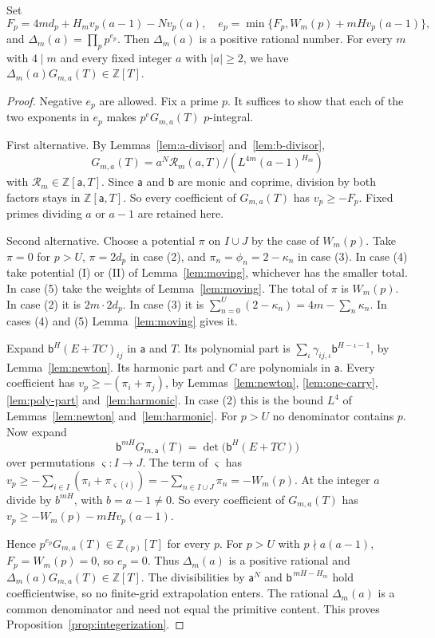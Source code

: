 \begin{proposition}\label{prop:integerization}
Set
\[
 F_p=4m d_p+H_m v_p(a-1)-Nv_p(a),
 \quad e_p=\min\{F_p,W_m(p)+mH v_p(a-1)\},
\]
and \(\Delta_m(a)=\prod_p p^{e_p}\). Then \(\Delta_m(a)\) is a positive rational number. For every \(m\) with \(4\mid m\) and every fixed integer \(a\) with \(|a|\ge2\), we have \(\Delta_m(a)G_{m,a}(T) \in \mathbb{Z}[T]\).
\end{proposition}

\begin{proof}
Negative \(e_p\) are allowed. Fix a prime \(p\). It suffices to show that each of the two exponents in \(e_p\) makes \(p^{e}G_{m,a}(T)\) \(p\)-integral.

First alternative. By Lemmas~\ref{lem:a-divisor} and~\ref{lem:b-divisor}, 
\[
 G_{m,a}(T)=a^N\mathcal R_m(a,T)/(L^{4m}(a-1)^{H_m})
\]
with \(\mathcal R_m\in\mathbb Z[\mathsf a,T]\). Since \(\mathsf a\) and \(\mathsf b\) are monic and coprime, division by both factors stays in \({\mathbb Z}[\mathsf a,T]\). So every coefficient of \(G_{m,a}(T)\) has \(v_p\ge-F_p\). Fixed primes dividing \(a\) or \(a-1\) are retained here.

Second alternative. Choose a potential \(\pi\) on \(I\cup J\) by the case of \(W_m(p)\). Take \(\pi=0\) for \(p>U\), \(\pi=2d_p\) in case (2), and \(\pi_n=\phi_n=2-\kappa_n\) in case (3). In case (4) take potential (I) or (II) of Lemma~\ref{lem:moving}, whichever has the smaller total. In case (5) take the weights of Lemma~\ref{lem:moving}. The total of \(\pi\) is \(W_m(p)\). In case (2) it is \(2m\cdot2d_p\). In case (3) it is \(\sum_{n=0}^{U}(2-\kappa_n)=4m-\sum_n\kappa_n\). In cases (4) and (5) Lemma~\ref{lem:moving} gives it.

Expand \(\mathsf b^H(E+TC)_{ij}\) in \(\mathsf a\) and \(T\). Its polynomial part is \(\sum_\iota\gamma_{ij,\iota}\mathsf b^{H-\iota-1}\), by Lemma~\ref{lem:newton}. Its harmonic part and \(C\) are polynomials in \(\mathsf a\). Every coefficient has \(v_p\ge-(\pi_i+\pi_j)\), by Lemmas~\ref{lem:newton}, \ref{lem:one-carry}, \ref{lem:poly-part} and~\ref{lem:harmonic}. In case (2) this is the bound \(L^4\) of Lemmas~\ref{lem:newton} and~\ref{lem:harmonic}. For \(p>U\) no denominator contains \(p\). Now expand
\[
 \mathsf b^{mH}G_{m,\mathsf a}(T)=\det\bigl(\mathsf b^H(E+TC)\bigr)
\]
over permutations \(\varsigma\colon I\to J\). The term of \(\varsigma\) has \(v_p\ge-\sum_{i\in I}(\pi_i+\pi_{\varsigma(i)})=-\sum_{n\in I\cup J}\pi_n=-W_m(p)\). At the integer \(a\) divide by \(b^{mH}\), with \(b=a-1\ne0\). So every coefficient of \(G_{m,a}(T)\) has \(v_p\ge-W_m(p)-mHv_p(a-1)\).

Hence \(p^{e_p}G_{m,a}(T)\in\mathbb Z_{(p)}[T]\) for every \(p\). For \(p>U\) with \(p\nmid a(a-1)\), \(F_p=W_m(p)=0\), so \(e_p=0\). Thus \(\Delta_m(a)\) is a positive rational and \(\Delta_m(a)G_{m,a}(T)\in\mathbb Z[T]\). The divisibilities by \(\mathsf a^N\) and \(\mathsf b^{\,mH-H_m}\) hold coefficientwise, so no finite-grid extrapolation enters. The rational \(\Delta_m(a)\) is a common denominator and need not equal the primitive content. This proves Proposition~\ref{prop:integerization}.
\end{proof}

